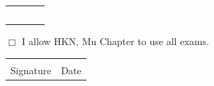\documentclass[10pt]{article}
\begin{document}
\begin{tabular}{llll}
  \vspace{2em}
  \underline{\hspace{7em}} & \underline{\hspace{7em}} &
  \underline{\hspace{15em}} & \underline{\hspace{15em}} \\

  \vspace{2em}
  \underline{\hspace{7em}} & \underline{\hspace{7em}} &
  \underline{\hspace{15em}} & \underline{\hspace{15em}} \\

  \vspace{2em}
  \underline{\hspace{7em}} & \underline{\hspace{7em}} &
  \underline{\hspace{15em}} & \underline{\hspace{15em}} \\

  \vspace{2em}
  \underline{\hspace{7em}} & \underline{\hspace{7em}} &
  \underline{\hspace{15em}} & \underline{\hspace{15em}} \\

  \vspace{2em}
  \underline{\hspace{7em}} & \underline{\hspace{7em}} &
  \underline{\hspace{15em}} & \underline{\hspace{15em}} \\
\end{tabular}

{\huge $\Box$} I allow HKN, Mu Chapter to use all exams.

\vspace{3em}

\begin{tabular}{ll}
  \underline{\hspace{20em}} & \underline{\hspace{15em}} \\
  Signature & Date
\end{tabular}
\end{document}
